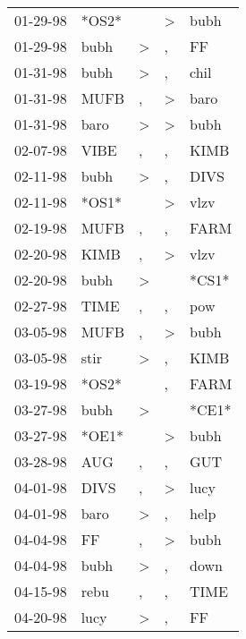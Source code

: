 \begin{supertabular}{lllll}
 01-29-98 &  *OS2* &                  &     \textgreater &   bubh \\
 01-29-98 &   bubh &     \textgreater &                , &     FF \\
 01-31-98 &   bubh &     \textgreater &                , &   chil \\
 01-31-98 &   MUFB &                , &     \textgreater &   baro \\
 01-31-98 &   baro &     \textgreater &     \textgreater &   bubh \\
 02-07-98 &   VIBE &                , &                , &   KIMB \\
 02-11-98 &   bubh &     \textgreater &                , &   DIVS \\
 02-11-98 &  *OS1* &                  &     \textgreater &   vlzv \\
 02-19-98 &   MUFB &                , &                , &   FARM \\
 02-20-98 &   KIMB &                , &     \textgreater &   vlzv \\
 02-20-98 &   bubh &     \textgreater &                  &  *CS1* \\
 02-27-98 &   TIME &                , &                , &    pow \\
 03-05-98 &   MUFB &                , &     \textgreater &   bubh \\
 03-05-98 &   stir &     \textgreater &                , &   KIMB \\
 03-19-98 &  *OS2* &                  &                , &   FARM \\
 03-27-98 &   bubh &     \textgreater &                  &  *CE1* \\
 03-27-98 &  *OE1* &                  &     \textgreater &   bubh \\
 03-28-98 &    AUG &                , &                , &    GUT \\
 04-01-98 &   DIVS &                , &     \textgreater &   lucy \\
 04-01-98 &   baro &     \textgreater &                , &   help \\
 04-04-98 &     FF &                , &     \textgreater &   bubh \\
 04-04-98 &   bubh &     \textgreater &                , &   down \\
 04-15-98 &   rebu &                , &                , &   TIME \\
 04-20-98 &   lucy &     \textgreater &                , &     FF \\

\end{supertabular}
